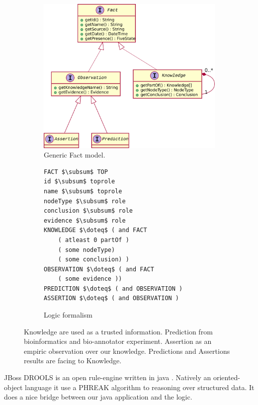 \documentclass{llncs}
\newcommand{\subsum}{\mathop{\raisebox{1ex}{$\cdot$}\!\!\!\!\leq}}
\begin{document}
\begin{figure}[H]
    \centering
    \begin{subfigure}{0.6\textwidth}
    \includegraphics[width=\textwidth]{plantuml/fact.pdf}
    \caption{Generic Fact model.}
    \label{fig:fact}
    \end{subfigure}
    \hfill{}
    \begin{subfigure}{0.3\textwidth}
        \begin{lstlisting}[mathescape, basicstyle=\fontfamily{lmvtt}\selectfont]
FACT $\subsum$ TOP
id $\subsum$ toprole
name $\subsum$ toprole
nodeType $\subsum$ role
conclusion $\subsum$ role
evidence $\subsum$ role
KNOWLEDGE $\doteq$ ( and FACT
    ( atleast 0 partOf )
    ( some nodeType)
    ( some conclusion) )
OBSERVATION $\doteq$ ( and FACT
    ( some evidence ))
PREDICTION $\doteq$ ( and OBSERVATION )
ASSERTION $\doteq$ ( and OBSERVATION )
        \end{lstlisting}
    \caption{Logic formalism}
    \end{subfigure}
    \caption{Knowledge are used as a trusted information. Prediction from bioinformatics and bio-annotator experiment. Assertion as an empiric observation over our knowledge. Predictions and Assertions results are facing to Knowledge.}
\end{figure}

JBoss DROOLS is an open rule-engine written in java \cite{proctor2008drools}. Natively an oriented-object language it use a PHREAK algorithm \cite{phreak} to reasoning over structured data. It does a nice bridge between our java application and the logic.
\end{document}
